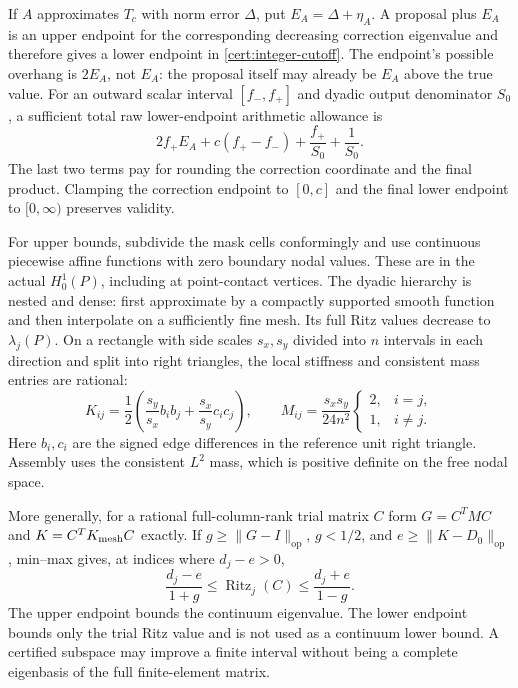 \documentclass[11pt,reqno]{amsart}
\numberwithin{equation}{section}
\newcommand{\norm}[1]{\lVert#1\rVert}
\begin{document}
If $A$ approximates $T_c$ with norm error $\Delta$, put
$E_A=\Delta+\eta_A$.  A proposal plus $E_A$ is an upper
endpoint for the corresponding decreasing correction
eigenvalue and therefore gives a lower endpoint in
\eqref{cert:integer-cutoff}.  The endpoint's possible overhang
is $2E_A$, not $E_A$: the proposal itself may already be
$E_A$ above the true value.  For an outward scalar interval
$[f_-,f_+]$ and dyadic output denominator $S_0$, a sufficient
total raw lower-endpoint arithmetic allowance is
\begin{equation}\label{arith:proposal-allowance}
 2f_+E_A+c(f_+-f_-)+\frac{f_+}{S_0}+\frac1{S_0}.
\end{equation}
The last two terms pay for rounding the correction coordinate
and the final product.  Clamping the correction endpoint to
$[0,c]$ and the final lower endpoint to $[0,\infty)$ preserves
validity.

For upper bounds, subdivide the mask cells conformingly and
use continuous piecewise affine functions with zero boundary
nodal values.  These are in the actual $H^1_0(P)$, including
at point-contact vertices.  The dyadic hierarchy is nested
and dense: first approximate by a compactly supported smooth
function and then interpolate on a sufficiently fine mesh.
Its full Ritz values decrease to $\lambda_j(P)$.  On a
rectangle with side scales $s_x,s_y$ divided into $n$ intervals
in each direction and split into right triangles, the local
stiffness and consistent mass entries are rational:
\[
 K_{ij}=\frac12\left(\frac{s_y}{s_x}b_i b_j+
                         \frac{s_x}{s_y}c_i c_j\right),
 \qquad
 M_{ij}=\frac{s_xs_y}{24n^2}
       \begin{cases}2,&i=j,\\1,&i\ne j.\end{cases}
\]
Here $b_i,c_i$ are the signed edge differences in the
reference unit right triangle.  Assembly uses the consistent
$L^2$ mass, which is positive definite on the free nodal
space.

More generally, for a rational full-column-rank trial matrix
$C$ form $G=C^TMC$ and $K=C^TK_{\rm mesh}C$ exactly.
If $g\ge\norm{G-I}_{\mathrm{op}}$, $g<1/2$, and
$e\ge\norm{K-D_0}_{\mathrm{op}}$, min--max gives, at indices
where $d_j-e>0$,
\begin{equation}\label{arith:ritz}
 \frac{d_j-e}{1+g}
 \le\operatorname{Ritz}_j(C)
 \le\frac{d_j+e}{1-g}.
\end{equation}
The upper endpoint bounds the continuum eigenvalue.
The lower endpoint bounds only the trial Ritz value and is
not used as a continuum lower bound.  A certified subspace
may improve a finite interval without being a complete
eigenbasis of the full finite-element matrix.
\end{document}
